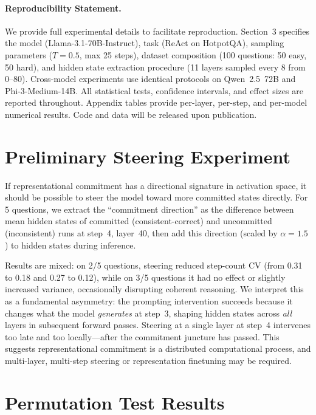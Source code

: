 \documentclass{article}
\begin{document}
\paragraph{Reproducibility Statement.} We provide full experimental details to facilitate reproduction. Section~3 specifies the model (Llama-3.1-70B-Instruct), task (ReAct on HotpotQA), sampling parameters ($T{=}0.5$, max 25 steps), dataset composition (100 questions: 50 easy, 50 hard), and hidden state extraction procedure (11 layers sampled every 8 from 0--80). Cross-model experiments use identical protocols on Qwen~2.5~72B and Phi-3-Medium-14B. All statistical tests, confidence intervals, and effect sizes are reported throughout. Appendix tables provide per-layer, per-step, and per-model numerical results. Code and data will be released upon publication.




\appendix

\section{Preliminary Steering Experiment}
\label{app:steering}

If representational commitment has a directional signature in activation space, it should be possible to steer the model toward more committed states directly. For 5 questions, we extract the ``commitment direction'' as the difference between mean hidden states of committed (consistent-correct) and uncommitted (inconsistent) runs at step~4, layer~40, then add this direction (scaled by $\alpha = 1.5$) to hidden states during inference.

Results are mixed: on 2/5 questions, steering reduced step-count CV (from 0.31 to 0.18 and 0.27 to 0.12), while on 3/5 questions it had no effect or slightly increased variance, occasionally disrupting coherent reasoning. We interpret this as a fundamental asymmetry: the prompting intervention succeeds because it changes what the model \emph{generates} at step~3, shaping hidden states across \emph{all} layers in subsequent forward passes. Steering at a single layer at step~4 intervenes too late and too locally---after the commitment juncture has passed. This suggests representational commitment is a distributed computational process, and multi-layer, multi-step steering \citep{zou2023repe} or representation finetuning may be required.

\section{Permutation Test Results}
\label{app:permutation}
\end{document}
